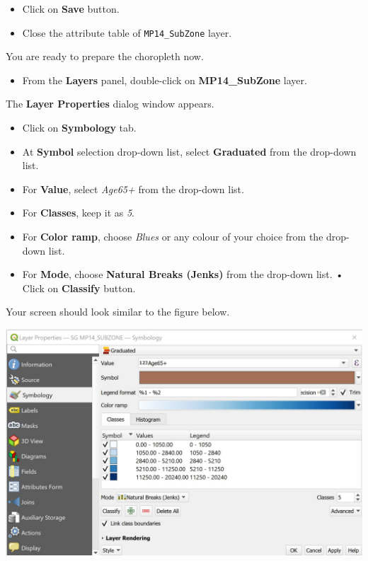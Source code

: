 \documentclass[
  letterpaper,
  DIV=11,
  numbers=noendperiod]{scrreprt}
\providecommand{\tightlist}{%
  \setlength{\itemsep}{0pt}\setlength{\parskip}{0pt}}\usepackage{longtable,booktabs,array}
\begin{document}
\begin{itemize}
\tightlist
\item
  Click on \textbf{Save} button.
\item
  Close the attribute table of \texttt{MP14\_SubZone} layer.
\end{itemize}

You are ready to prepare the choropleth now.

\begin{itemize}
\tightlist
\item
  From the \textbf{Layers} panel, double-click on \textbf{MP14\_SubZone}
  layer.
\end{itemize}

The \textbf{Layer Properties} dialog window appears.

\begin{itemize}
\tightlist
\item
  Click on \textbf{Symbology} tab.
\item
  At \textbf{Symbol} selection drop-down list, select \textbf{Graduated}
  from the drop-down list.
\item
  For \textbf{Value}, select \emph{Age65+} from the drop-down list.
\item
  For \textbf{Classes}, keep it as \emph{5}.
\item
  For \textbf{Color ramp}, choose \emph{Blues} or any colour of your
  choice from the drop-down list.
\item
  For \textbf{Mode}, choose \textbf{Natural Breaks (Jenks)} from the
  drop-down list. • Click on \textbf{Classify} button.
\end{itemize}

Your screen should look similar to the figure below.

\includegraphics{./img03/image34.jpg}
\end{document}
